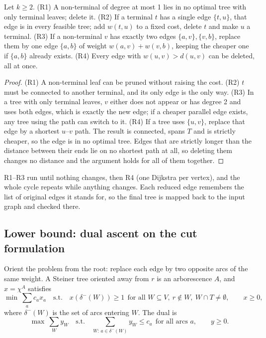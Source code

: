 \begin{lemma}\label{lem:reductions}
Let \(k\ge2\). (R1) A non-terminal of degree at most 1 lies in no optimal tree with only terminal leaves; delete it.
(R2) If a terminal \(t\) has a single edge \(\{t,u\}\), that edge is in every feasible tree; add \(w(t,u)\) to a fixed cost, delete \(t\)
and make \(u\) a terminal. (R3) If a non-terminal \(v\) has exactly two edges \(\{a,v\},\{v,b\}\), replace them by one edge
\(\{a,b\}\) of weight \(w(a,v)+w(v,b)\), keeping the cheaper one if \(\{a,b\}\) already exists. (R4) Every edge with
\(w(u,v)>d(u,v)\) can be deleted, all at once.
\end{lemma}
\begin{proof}
(R1) A non-terminal leaf can be pruned without raising the cost. (R2) \(t\) must be connected to another terminal, and its only
edge is the only way. (R3) In a tree with only terminal leaves, \(v\) either does not appear or has degree 2 and uses both edges, which
is exactly the new edge; if a cheaper parallel edge exists, any tree using the path can switch to it. (R4) If a tree uses
\(\{u,v\}\), replace that edge by a shortest \(u\)--\(v\) path. The result is connected, spans \(T\) and is strictly cheaper, so the
edge is in no optimal tree. Edges that are strictly longer than the distance between their ends lie on no shortest path at all, so
deleting them changes no distance and the argument holds for all of them together.
\end{proof}
\noindent R1--R3 run until nothing changes, then R4 (one Dijkstra per vertex), and the whole cycle repeats while anything changes.
Each reduced edge remembers the list of original edges it stands for, so the final tree is mapped back to the input graph and checked
there.

\subsection{Lower bound: dual ascent on the cut formulation}
Orient the problem from the root: replace each edge by two opposite arcs of the same weight. A Steiner tree oriented away from \(r\) is
an arborescence \(A\), and \(x=\chi^{A}\) satisfies
\[\min\ \sum_{a}c_a x_a\quad\text{s.t.}\quad x(\delta^-(W))\ge1\ \ \text{for all }W\subseteq V,\ r\notin W,\ W\cap T\neq\emptyset,\qquad x\ge0, \tag{P}\]
where \(\delta^-(W)\) is the set of arcs entering \(W\). The dual is
\[\max\ \sum_W y_W\quad\text{s.t.}\quad \sum_{W:\,a\in\delta^-(W)}y_W\le c_a\ \ \text{for all arcs }a,\qquad y\ge0. \tag{D}\]

